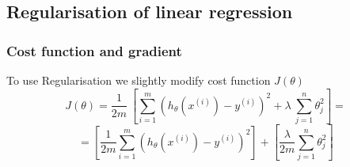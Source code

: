 \documentclass{article}
\begin{document}
\subsection{Regularisation of linear regression}
\subsubsection{Cost function and gradient}
To use Regularisation we slightly modify cost function $J(\theta)$
\begin{equation}
J(\theta) = \dfrac{1}{2m}\ \left[ \sum_{i=1}^m (h_\theta(x^{(i)}) - y^{(i)})^2 + \lambda\ \sum_{j=1}^n \theta_j^2 \right] =
\end{equation}
\begin{equation*}
= \left[ \dfrac{1}{2m} \sum_{i=1}^m (h_\theta(x^{(i)}) - y^{(i)})^2\right] + \left[ \dfrac{\lambda}{2m} \sum_{j=1}^n \theta_j^2 \right] 
\end{equation*}
\end{document}
